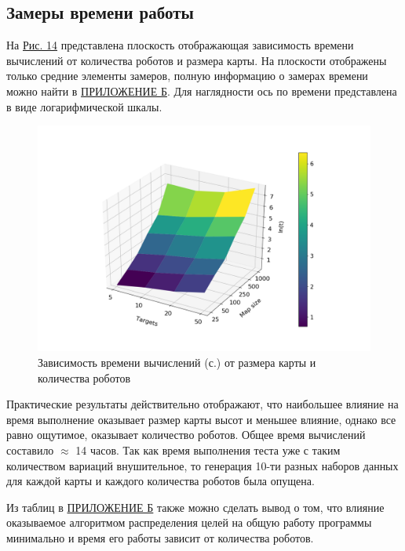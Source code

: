 \documentclass{article}
\numberwithin{equation}{section}
\begin{document}
		\subsection{Замеры времени работы}

			На \hyperref[fig:time_surface]{Рис. 14} представлена плоскость отображающая зависимость времени вычислений от количества роботов и размера карты. На плоскости отображены только средние элементы замеров, полную информацию о замерах времени можно найти в \hyperref[sec:time]{ПРИЛОЖЕНИЕ Б}. Для наглядности ось по времени представлена в виде логарифмической шкалы.

			\begin{figure}[H]
				\centering
				\vspace{-0.5cm}
				\includegraphics[width=\textwidth]{data/mean_surface.png}
				\vspace{-0.5cm}
				\caption{Зависимость времени вычислений (с.) от размера карты и количества роботов}\label{fig:time_surface}
			\end{figure}

			Практические результаты действительно отображают, что наибольшее влияние на время выполнение оказывает размер карты высот и меньшее влияние, однако все равно ощутимое, оказывает количество роботов. Общее время вычислений составило $\approx$ 14 часов. Так как время выполнения теста уже с таким количеством вариаций внушительное, то генерация 10-ти разных наборов данных для каждой карты и каждого количества роботов была опущена.

			Из таблиц в \hyperref[sec:time]{ПРИЛОЖЕНИЕ Б} также можно сделать вывод о том, что влияние оказываемое алгоритмом распределения целей на общую работу программы минимально и время его работы зависит от количества роботов.
\end{document}
